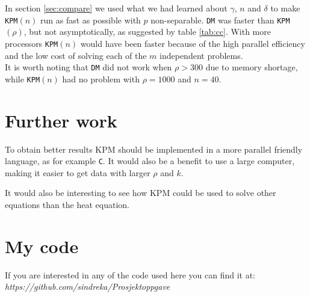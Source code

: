 In section \ref{sec:compare} we used what we had learned about $\gamma$, $n$ and $\delta$ to make \texttt{KPM}$(n)$ run as fast as possible with $p$ non-separable. \texttt{DM} was faster than \texttt{KPM}$(\rho)$, but not asymptotically, as suggested by table \ref{tab:cc}. With more processors \texttt{KPM}$(n)$ would have been faster because of the high parallel efficiency and the low cost of solving each of the $m$ independent problems. \\





It is worth noting that \texttt{DM} did not work when $\rho>300$ due to memory shortage, while \texttt{KPM}$(n)$ had no problem with $\rho = 1000$ and $n = 40$. \\

\chapter*{Further work}%
To obtain better results KPM should be implemented in a more parallel friendly language, as for example \texttt{C}. It would also be a benefit to use a large computer, making it easier to get data with larger $\rho$ and $k$.

It would also be interesting to see how KPM could be used to solve other equations than the heat equation.
\chapter*{My code}%

If you are interested in any of the code used here you can find it at: \\
\emph{https://github.com/sindreka/Prosjektoppgave}
